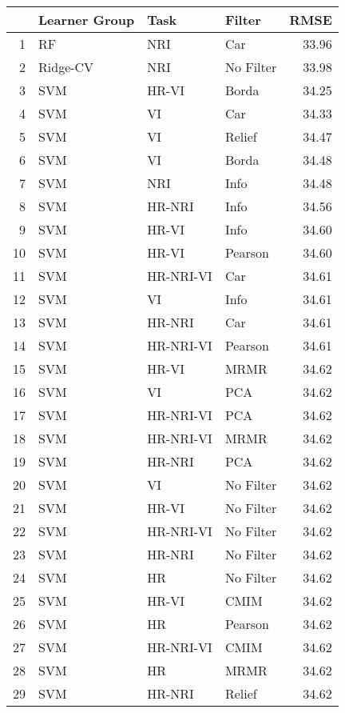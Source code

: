 \begin{table}[ht]
\centering
\begin{tabular}{rlllr}
  \hline
 & Learner Group & Task & Filter & RMSE \\ 
  \hline
1 & RF & NRI & Car & 33.96 \\ 
  2 & Ridge-CV & NRI & No Filter & 33.98 \\ 
  3 & SVM & HR-VI & Borda & 34.25 \\ 
  4 & SVM & VI & Car & 34.33 \\ 
  5 & SVM & VI & Relief & 34.47 \\ 
  6 & SVM & VI & Borda & 34.48 \\ 
  7 & SVM & NRI & Info & 34.48 \\ 
  8 & SVM & HR-NRI & Info & 34.56 \\ 
  9 & SVM & HR-VI & Info & 34.60 \\ 
  10 & SVM & HR-VI & Pearson & 34.60 \\ 
  11 & SVM & HR-NRI-VI & Car & 34.61 \\ 
  12 & SVM & VI & Info & 34.61 \\ 
  13 & SVM & HR-NRI & Car & 34.61 \\ 
  14 & SVM & HR-NRI-VI & Pearson & 34.61 \\ 
  15 & SVM & HR-VI & MRMR & 34.62 \\ 
  16 & SVM & VI & PCA & 34.62 \\ 
  17 & SVM & HR-NRI-VI & PCA & 34.62 \\ 
  18 & SVM & HR-NRI-VI & MRMR & 34.62 \\ 
  19 & SVM & HR-NRI & PCA & 34.62 \\ 
  20 & SVM & VI & No Filter & 34.62 \\ 
  21 & SVM & HR-VI & No Filter & 34.62 \\ 
  22 & SVM & HR-NRI-VI & No Filter & 34.62 \\ 
  23 & SVM & HR-NRI & No Filter & 34.62 \\ 
  24 & SVM & HR & No Filter & 34.62 \\ 
  25 & SVM & HR-VI & CMIM & 34.62 \\ 
  26 & SVM & HR & Pearson & 34.62 \\ 
  27 & SVM & HR-NRI-VI & CMIM & 34.62 \\ 
  28 & SVM & HR & MRMR & 34.62 \\ 
  29 & SVM & HR-NRI & Relief & 34.62 \\ 

\end{tabular}
\end{table}

